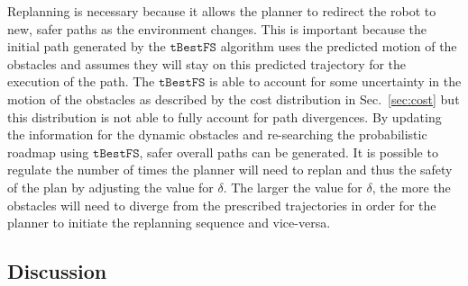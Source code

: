 \documentclass[letterpaper, 10pt, conference]{ieeeconf}
\newcommand{\Acronym}[1]{\ensuremath{{{\texttt{#1}}}}}
\newtheorem{theorem}{Theorem}
\begin{document}
Replanning is necessary because it allows the planner to redirect the robot to
new, safer paths as the environment changes. This is important because the
initial path generated by the $\Acronym{tBestFS}$ algorithm uses the predicted
motion of the obstacles and assumes they will stay on this predicted trajectory
for the execution of the path. The $\Acronym{tBestFS}$ is able to account for
some uncertainty in the motion of the obstacles as described by the cost
distribution in Sec.~\ref{sec:cost} but this distribution is not able to fully
account for path divergences. By updating the information for the dynamic
obstacles and re-searching the probabilistic roadmap using $\Acronym{tBestFS}$,
safer overall paths can be generated. It is possible to regulate the number of
times the planner will need to replan and thus the safety of the plan by
adjusting the value for $\delta$. The larger the value for $\delta$, the more
the obstacles will need to diverge from the prescribed trajectories in order
for the planner to initiate the replanning sequence and vice-versa.

%
%
%
%
%
%
%

\subsection{Discussion}

\label{sec:plannerdiscussion}
\end{document}
